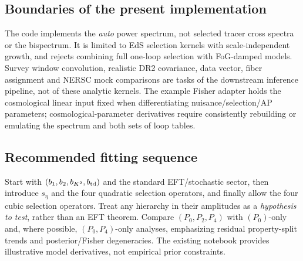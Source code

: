 \documentclass[11pt,a4paper]{article}
\begin{document}
\subsection{Boundaries of the present implementation}
The code implements the \emph{auto} power spectrum, not selected tracer cross spectra or the bispectrum. It is limited to EdS selection kernels with scale-independent growth, and rejects combining full one-loop selection with FoG-damped models. Survey window convolution, realistic DR2 covariance, data vector, fiber assignment and NERSC mock comparisons are tasks of the downstream inference pipeline, not of these analytic kernels. The example Fisher adapter holds the cosmological linear input fixed when differentiating nuisance/selection/AP parameters; cosmological-parameter derivatives require consistently rebuilding or emulating the spectrum and both sets of loop tables.

\subsection{Recommended fitting sequence}
Start with $(b_1,b_2,b_{K^2},b_{\rm td})$ and the standard EFT/stochastic sector, then introduce $s_\eta$ and the four quadratic selection operators, and finally allow the four cubic selection operators. Treat any hierarchy in their amplitudes as a \emph{hypothesis to test}, rather than an EFT theorem. Compare $(P_0,P_2,P_4)$ with $(P_0)$-only and, where possible, $(P_0,P_4)$-only analyses, emphasizing residual property-split trends and posterior/Fisher degeneracies. The existing notebook provides illustrative model derivatives, not empirical prior constraints.
\end{document}
